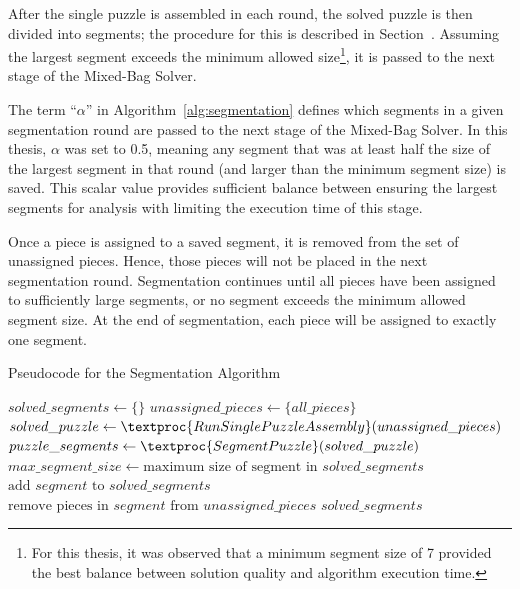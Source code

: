 After the single puzzle is assembled in each round, the solved puzzle is then divided into segments; the procedure for this is described in Section~\label{sec:segmentPuzzle}.  Assuming the largest segment exceeds the minimum allowed size\footnote{For this thesis, it was observed that a minimum segment size of 7 provided the best balance between solution quality and algorithm execution time.}, it is passed to the next stage of the Mixed-Bag Solver.  

The term ``\textit{$\alpha$}'' in Algorithm~\ref{alg:segmentation} defines which segments in a given segmentation round are passed to the next stage of the Mixed-Bag Solver.  In this thesis, \textit{$\alpha$} was set to 0.5, meaning any segment that was at least half the size of the largest segment in that round (and larger than the minimum segment size) is saved.  This scalar value provides sufficient balance between ensuring the largest segments for analysis with limiting the execution time of this stage.

Once a piece is assigned to a saved segment, it is removed from the set of unassigned pieces.  Hence, those pieces will not be placed in the next segmentation round.  Segmentation continues until all pieces have been assigned to sufficiently large segments, or no segment exceeds the minimum allowed segment size. At the end of segmentation, each piece will be assigned to exactly one segment.

\begin{algorithm}
\caption{Pseudocode for the Segmentation Algorithm}\label{alg:segmentation}
\begin{algorithmic}[1]
    \State $\textit{solved\_segments} \gets \{ \}$
    \State $unassigned\_pieces \gets \{ \textit{all\_pieces} \}$
    \Repeat
        \State $solved\_puzzle \gets \textproc{RunSinglePuzzleAssembly}(unassigned\_pieces)$
        \State $puzzle\_segments \gets \textproc{SegmentPuzzle}(solved\_puzzle\text)$
        \State $max\_segment\_size \gets \text{maximum size of segment in } solved\_segments$
                \State $\text{add } segment \text{ to } solved\_segments$
                \State $\text{remove pieces in } segment \text{ from } unassigned\_pieces$
            \EndIf
        \EndFor
    \State \Return $solved\_segments$
\EndFunction
\end{algorithmic}
\end{algorithm}

